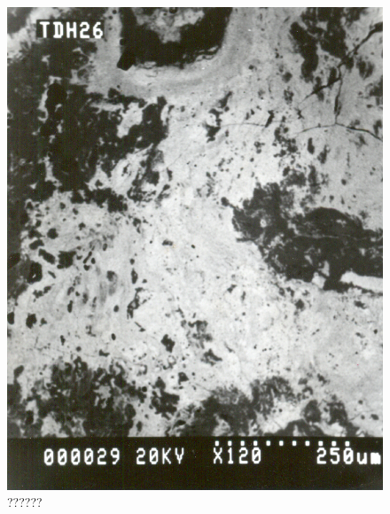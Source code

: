 \begin{figure}[H]
\renewcommand{\thefigure}{26A}
\includegraphics[scale=0.65]{images/chapter-4/fig026A.jpg}
\caption{??????}\label{chapter-4-fig26A}
\end{figure}

\newpage

